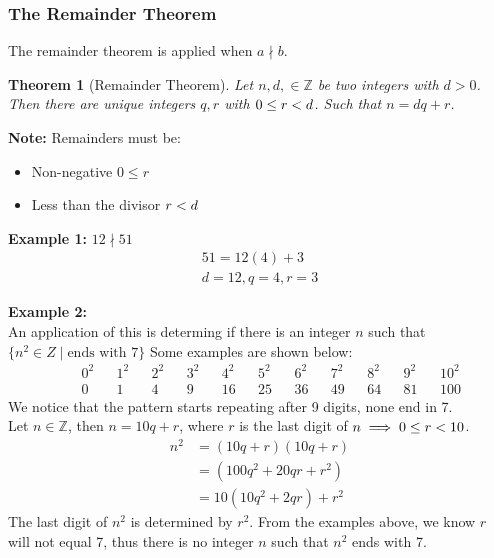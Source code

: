 \documentclass[12pt]{article}
\newcommand{\lt}{\ensuremath <}
\newcommand{\Z}{\mathbb{Z}}
\newtheorem{theorem}{Theorem}
\theoremstyle{definition}
\begin{document}
    \subsubsection{The Remainder Theorem}
    The remainder theorem is applied when $a \nmid b$. \\
    \begin{theorem}[Remainder Theorem]
        \label{thm:remainder-theorem}
        Let $n,d,\in \Z$ be two integers with $d > 0$. Then there are unique integers $q, r$ with
        $0 \le r \lt d$. Such that $n = dq + r$.
    \end{theorem}

    \textbf{Note:} Remainders must be:
    \begin{itemize}
        \item Non-negative $0 \le r$
        \item Less than the divisor $r \lt d$
    \end{itemize}

    \textbf{Example 1:} $12 \nmid 51$
    \begin{align*}
        51 = 12(4) + 3 \\
        d = 12, q = 4, r = 3
    \end{align*}

    \textbf{Example 2:} \\
    An application of this is determing if there is an integer $n$ such that 
    $\{n^2 \in Z \mid \text{ends with 7}\}$ Some examples are shown below:
    \begin{align*}
        &&0^2 &&1^2 &&2^2 &&3^2 &&4^2 &&5^2 &&6^2 &&7^2 &&8^2 &&9^2 &&10^2 \\
        &&0 &&1 &&4 &&9 &&16 &&25 &&36 &&49 &&64 &&81 &&100
    \end{align*}
    We notice that the pattern starts repeating after 9 digits, none end in 7. \\
    Let $n \in \Z$, then $n = 10q + r$, where $r$ is the last digit of $n \implies 
    0 \le r \lt 10$.
    \begin{align*}
        n^2 &= (10q + r)(10q + r) \\
        &= (100q^2 + 20qr + r^2) \\
        &= 10(10q^2 + 2qr) + r^2
    \end{align*}
    The last digit of $n^2$ is determined by $r^2$. From the examples above, we know
    $r$ will not equal 7, thus there is no integer $n$ such that $n^2$ ends with 7.
\end{document}
